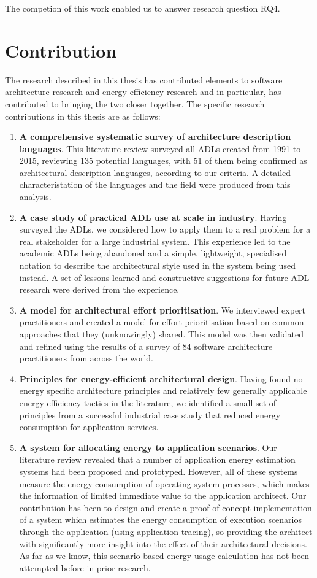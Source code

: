 The competion of this work enabled us to answer research question RQ4.

\section{Contribution}

The research described in this thesis has contributed elements to software architecture research and energy efficiency research and in particular, has contributed to bringing the two closer together.
\pagebreak
The specific research contributions in this thesis are as follows: \nopagebreak
\begin{enumerate}
	\item \textbf{A comprehensive systematic survey of architecture description languages}.  This literature review surveyed all ADLs created from 1991 to 2015, reviewing 135 potential languages, with 51 of them being confirmed as architectural description languages, according to our criteria.  A detailed characteristation of the languages and the field were produced from this analysis.
	\item \textbf{A case study of practical ADL use at scale in industry}.  Having surveyed the ADLs, we considered how to apply them to a real problem for a real stakeholder for a large industrial system.  This experience led to the academic ADLs being abandoned and a simple, lightweight, specialised notation to describe the architectural style used in the system being used instead.  A set of lessons learned and constructive suggestions for future ADL research were derived from the experience.
	\item \textbf{A model for architectural effort prioritisation}.  We interviewed expert practitioners and created a model for effort prioritisation based on common approaches that they (unknowingly) shared.  This model was then validated and refined using the results of a survey of 84 software architecture practitioners from across the world.
	\item \textbf{Principles for energy-efficient architectural design}.  Having found no energy specific architecture principles and relatively few generally applicable energy efficiency tactics in the literature, we identified a small set of principles from a successful industrial case study that reduced energy consumption for application services.
	\item \textbf{A system for allocating energy to application scenarios}.  Our literature review revealed that a number of application energy estimation systems had been proposed and prototyped.  However, all of these systems measure the energy consumption of operating system processes, which makes the information of limited immediate value to the application architect.  Our contribution has been to design and create a proof-of-concept implementation of a system which estimates the energy consumption of execution scenarios through the application (using application tracing), so providing the architect with significantly more insight into the effect of their architectural decisions. As far as we know, this scenario based energy usage calculation has not been attempted before in prior research.

\end{enumerate}
